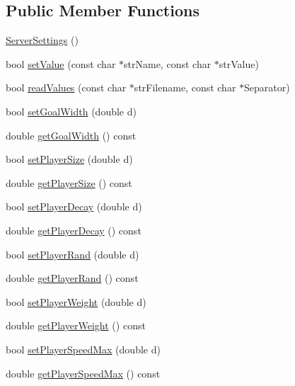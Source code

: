 \subsection*{Public Member Functions}
\begin{DoxyCompactItemize}
\item 
\hyperlink{classServerSettings_a65be809682094811350d59e690c22831}{Server\+Settings} ()
\item 
bool \hyperlink{classServerSettings_a12701675a372aefe05dfc39c86eb5b12}{set\+Value} (const char $\ast$str\+Name, const char $\ast$str\+Value)
\item 
bool \hyperlink{classServerSettings_aa4bd916ba3cde79d52adc764ee14256f}{read\+Values} (const char $\ast$str\+Filename, const char $\ast$Separator)
\item 
bool \hyperlink{classServerSettings_a60cee781ce0f63a646ec2b6a7696a547}{set\+Goal\+Width} (double d)
\item 
double \hyperlink{classServerSettings_a243427731c0333bc84251c7c305a8b99}{get\+Goal\+Width} () const 
\item 
bool \hyperlink{classServerSettings_ac734b38c5c773d4387132385e2202dc5}{set\+Player\+Size} (double d)
\item 
double \hyperlink{classServerSettings_abbc3b0ef688f88cc27e72d6844759083}{get\+Player\+Size} () const 
\item 
bool \hyperlink{classServerSettings_a688caba9b3229f3548583332e5a9dfdf}{set\+Player\+Decay} (double d)
\item 
double \hyperlink{classServerSettings_a5e7bce215ae06c78d67d232006f06807}{get\+Player\+Decay} () const 
\item 
bool \hyperlink{classServerSettings_a602e1527d12cfbcffbaf348830442d31}{set\+Player\+Rand} (double d)
\item 
double \hyperlink{classServerSettings_a328bdc1051341a09ee05093b4d3ec4e3}{get\+Player\+Rand} () const 
\item 
bool \hyperlink{classServerSettings_a1b2d8a0695235a120111c08f14711b68}{set\+Player\+Weight} (double d)
\item 
double \hyperlink{classServerSettings_a8e03f895c80c32ce4154cd27536d11d1}{get\+Player\+Weight} () const 
\item 
bool \hyperlink{classServerSettings_a4d97721c0b134407b25e55947b4c1da3}{set\+Player\+Speed\+Max} (double d)
\item 
double \hyperlink{classServerSettings_ab3cae216e2ebecb9eab51efade2e6aea}{get\+Player\+Speed\+Max} () const 
\item 

\end{DoxyCompactItemize}
